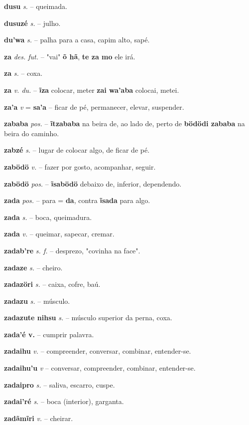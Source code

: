 \textbf{dusu} \textit{s.} -- queimada.

\textbf{dusuzé} \textit{s.} -- julho.

\textbf{du'wa} \textit{s.} -- palha para a casa, capim alto, sapé.

\textbf{za} \textit{des. fut.} -- "vai"  \textbf{õ hã}, \textbf{te za mo} ele irá.

\textbf{za} \textit{s.} -- coxa.

\textbf{za} \textit{v. du.} -- \textbf{ĩza} colocar, meter  \textbf{zai wa'aba} colocai, metei.

\textbf{za'a} \textit{v} = \textbf{sa'a} -- ficar de pé, permanecer, elevar, suspender.

\textbf{zababa} \textit{pos.} -- \textbf{ĩtzababa} na beira de, ao lado de, perto de  \textbf{bödödi zababa} na beira do caminho.

\textbf{zabzé} \textit{s.} -- lugar de colocar algo, de ficar de pé.

\textbf{zabödö} \textit{v.} -- fazer por gosto, acompanhar, seguir.

\textbf{zabödö} \textit{pos.} -- \textbf{ĩsabödö} debaixo de, inferior, dependendo.

\textbf{zada} \textit{pos.} -- para = \textbf{da}, contra  \textbf{ĩsada} para algo.

\textbf{zada} \textit{s.} -- boca, queimadura.

\textbf{zada} \textit{v.} -- queimar, sapecar, cremar.

\textbf{zadab're} \textit{s. f.} -- desprezo, "covinha na face".

\textbf{zadaze} \textit{s.} -- cheiro.

\textbf{zadazöri} \textit{s.} -- caixa, cofre, baú.

\textbf{zadazu} \textit{s.} -- músculo.

\textbf{zadazute nihsu} \textit{s.} -- músculo superior da perna, coxa.

\textbf{zada'é v.} -- cumprir palavra.

\textbf{zadaihu} \textit{v.} -- compreender, conversar, combinar, entender-se.

\textbf{zadaihu'u} \textit{v} -- conversar, compreender, combinar, entender-se.

\textbf{zadaipro} \textit{s.} -- saliva, escarro, cuspe.

\textbf{zadai'ré} \textit{s.} -- boca (interior), garganta.

\textbf{zadãmĩri} \textit{v.} -- cheirar.

